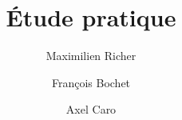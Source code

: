 \documentclass[a4paper,11pt]{report}
\title{Étude pratique }
\author{Maximilien Richer}
\author{François Bochet}
\author{Axel Caro}
\begin{document}
\maketitle
\tableofcontents

\begin{abstract}
\end{abstract}

\chapter{}
\end{document}
